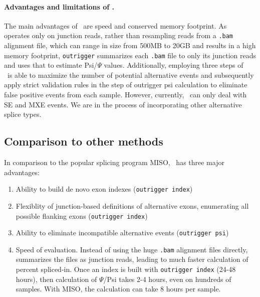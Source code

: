\paragraph{Advantages and limitations of \outrigger.}

The main advantages of \outrigger\, are speed and conserved memory footprint. As \outrigger\, operates only on junction reads, rather than resampling reads from a \texttt{.bam} alignment file, which can range in size from 500MB to 20GB and results in a high memory footprint, \texttt{outrigger} summarizes each \texttt{.bam} file to only its junction reads and uses that to estimate Psi/$\Psi$ values. Additionally, employing three steps of \outrigger\, \outrigger\ is able to maximize the number of potential alternative events and subsequently apply strict validation rules in the step of outrigger psi calculation to eliminate false positive events from each sample.
However, currently, \outrigger\ can only deal with SE and MXE events. We are in the process of incorporating other alternative splice types.



\subsection{Comparison to other methods}

In comparison to the popular splicing program MISO\cite{Katz:2010iv}, \outrigger\, has three major advantages:

\begin{enumerate}
	\item Ability to build de novo exon indexes (\texttt{outrigger index})
	\item Flexiblity of junction-based definitions of alternative exons, enumerating all possible flanking exons (\texttt{outrigger index})
	\item Ability to eliminate incompatible alternative events (\texttt{outrigger psi})
	\item Speed of evaluation. Instead of using the huge \texttt{.bam} alignment files directly, \outrigger\, summarizes the files as junction reads, leading to much faster calculation of percent spliced-in. Once an index is built with \texttt{outrigger index} (24-48 hours), then calculation of $\Psi$/Psi takes 2-4 hours, even on hundreds of samples. With MISO, the calculation can take 8 hours per sample.
\end{enumerate}


